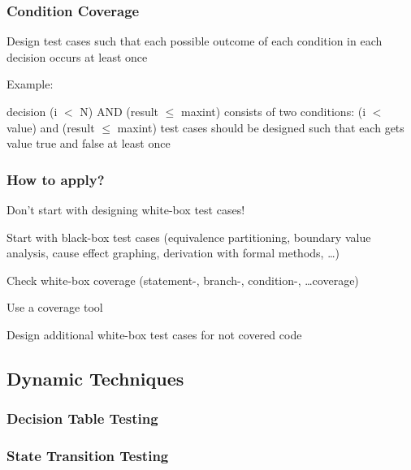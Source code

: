 
\subsubsection{Condition Coverage}

\begin{itemize*}
	\item Design test cases such that each possible outcome of each condition in each decision occurs at least once
	\item Example:
	\begin{itemize*}
		\item decision (i $<$ N) AND (result $\leq$ maxint) consists of two conditions: (i $<$ value) and (result $\leq$ maxint) test cases should be designed such that each gets value
		true and false at least once
	\end{itemize*}
\end{itemize*}


\subsubsection{How to apply?}

\begin{itemize*}
	\item Don't start with designing white-box test cases!
	\item Start with black-box test cases
	(equivalence partitioning, boundary value analysis, cause effect graphing, derivation with formal methods, \ldots)
	\item Check white-box coverage (statement-, branch-, condition-, \ldots coverage)
	\item Use a coverage tool
	\item Design additional white-box test cases for not covered code
\end{itemize*}

\subsection{Dynamic Techniques}

\subsubsection{Decision Table Testing}

\subsubsection{State Transition Testing}

